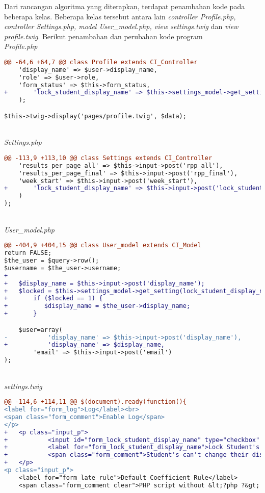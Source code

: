 Dari rancangan algoritma yang diterapkan, terdapat penambahan kode pada beberapa kelas. Beberapa kelas tersebut antara lain \textit{controller Profile.php, controller Settings.php, model User\_model.php, view settings.twig} dan \textit{view profile.twig}.
Berikut penambahan dan perubahan kode program
~\\
\textit{Profile.php}
\begin{lstlisting}[language=diff, basicstyle=\ttfamily, frame=single,
columns=fullflexible, keepspaces=true, breaklines=true]
@@ -64,6 +64,7 @@ class Profile extends CI_Controller
	'display_name' => $user->display_name,
	'role' => $user->role,
	'form_status' => $this->form_status,
+   	'lock_student_display_name' => $this->settings_model->get_setting(lock_student_display_name),
	);

$this->twig->display('pages/profile.twig', $data);
\end{lstlisting}
~\\
\textit{Settings.php}
\begin{lstlisting}[language=diff, basicstyle=\ttfamily, frame=single,
columns=fullflexible, keepspaces=true, breaklines=true]
@@ -113,9 +113,10 @@ class Settings extends CI_Controller
	'results_per_page_all' => $this->input->post('rpp_all'),
	'results_per_page_final' => $this->input->post('rpp_final'),
	'week_start' => $this->input->post('week_start'),
+   	'lock_student_display_name' => $this->input->post('lock_student_display_name')===NULL?0:1,
	)
);
\end{lstlisting}
~\\
\textit{User\_model.php}
\begin{lstlisting}[language=diff, basicstyle=\ttfamily, frame=single,
columns=fullflexible, keepspaces=true, breaklines=true]
@@ -404,9 +404,15 @@ class User_model extends CI_Model
return FALSE;
$the_user = $query->row();
$username = $the_user->username;
+
+   $display_name = $this->input->post('display_name');
+   $locked = $this->settings_model->get_setting(lock_student_display_name);
+   	if ($locked == 1) {
+          $display_name = $the_user->display_name;
+       }

	$user=array(
-   		'display_name' => $this->input->post('display_name'),
+      		'display_name' => $display_name,
		'email' => $this->input->post('email')
);
\end{lstlisting}
~\\
\textit{settings.twig}
\begin{lstlisting}[language=diff, basicstyle=\ttfamily, frame=single,
columns=fullflexible, keepspaces=true, breaklines=true]
@@ -114,6 +114,11 @@ $(document).ready(function(){
<label for="form_log">Log</label><br>
<span class="form_comment">Enable Log</span>
</p>
+   <p class="input_p">
+   		<input id="form_lock_student_display_name" type="checkbox" name="lock_student_display_name" value="1" {{ lock_student_display_name ? 'checked' }}/>
+   		<label for="form_lock_student_display_name">Lock Student's Display Name</label><br>
+           <span class="form_comment">Student's can't change their display name</span>
+   </p>
<p class="input_p">
	<label for="form_late_rule">Default Coefficient Rule</label>
	<span class="form_comment clear">PHP script without &lt;?php ?&gt; tags</span><br>
\end{lstlisting}
